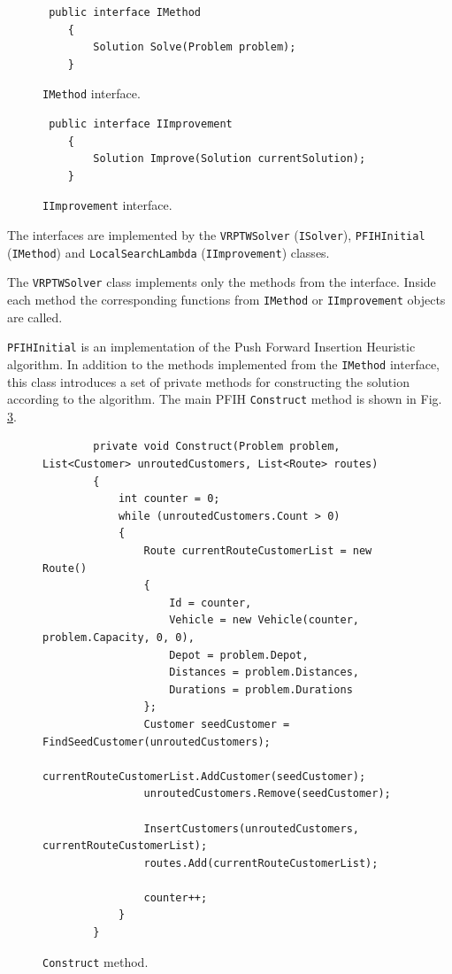 \documentclass[a4paper,twoside,12pt]{book}
\begin{document}
\begin{figure}[H]
\centering
\begin{lstlisting}
 public interface IMethod
    {
        Solution Solve(Problem problem);
    }
\end{lstlisting}
\caption{\lstinline{IMethod} interface.}
\label{fig:iMethod}
\end{figure}

\begin{figure}[H]
\centering
\begin{lstlisting}
 public interface IImprovement
    {
        Solution Improve(Solution currentSolution);
    }
\end{lstlisting}
\caption{\lstinline{IImprovement} interface.}
\label{fig:iImprovement}
\end{figure}

The interfaces are implemented by the \lstinline{VRPTWSolver} (\lstinline{ISolver}), \lstinline{PFIHInitial} (\lstinline{IMethod}) and \lstinline{LocalSearchLambda} (\lstinline{IImprovement}) classes.

The \lstinline{VRPTWSolver} class implements only the methods from the interface. Inside each method the corresponding functions from \lstinline{IMethod} or \lstinline{IImprovement} objects are called.

\lstinline{PFIHInitial} is an implementation of the Push Forward Insertion Heuristic algorithm. In addition to the methods implemented from the \lstinline{IMethod} interface, this class introduces a set of private methods for constructing the solution according to the algorithm. The main PFIH \lstinline{Construct} method is shown in Fig. \ref{fig:construct}.

\begin{figure}
\centering
\begin{lstlisting}
        private void Construct(Problem problem, List<Customer> unroutedCustomers, List<Route> routes)
        {
            int counter = 0;
            while (unroutedCustomers.Count > 0)
            {
                Route currentRouteCustomerList = new Route()
                {
                    Id = counter,
                    Vehicle = new Vehicle(counter, problem.Capacity, 0, 0),
                    Depot = problem.Depot,
                    Distances = problem.Distances,
                    Durations = problem.Durations
                };
                Customer seedCustomer = FindSeedCustomer(unroutedCustomers);
                currentRouteCustomerList.AddCustomer(seedCustomer);
                unroutedCustomers.Remove(seedCustomer);

                InsertCustomers(unroutedCustomers, currentRouteCustomerList);
                routes.Add(currentRouteCustomerList);

                counter++;
            }
        }
\end{lstlisting}
\caption{\lstinline{Construct} method.}
\label{fig:construct}
\end{figure}
\end{document}
